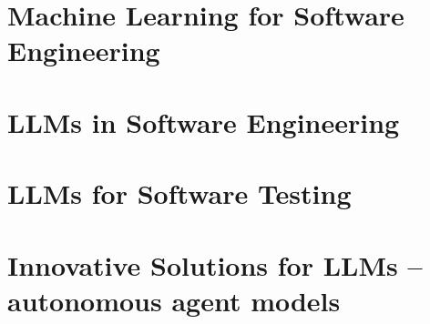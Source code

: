 \documentclass[presentation, 10pt]{beamer}\mode<presentation>{\usetheme{AMSBolognaFC}}
\begin{document}
\section{Machine Learning for Software Engineering}
\section{LLMs in Software Engineering}

\section{LLMs for Software Testing}

\section{Innovative Solutions for LLMs -- autonomous agent models}

\frame{\titlepage}

\section*{\refname}

\begin{frame}{\refname}
	\tiny
	\printbibliography
\end{frame}

\end{document}
